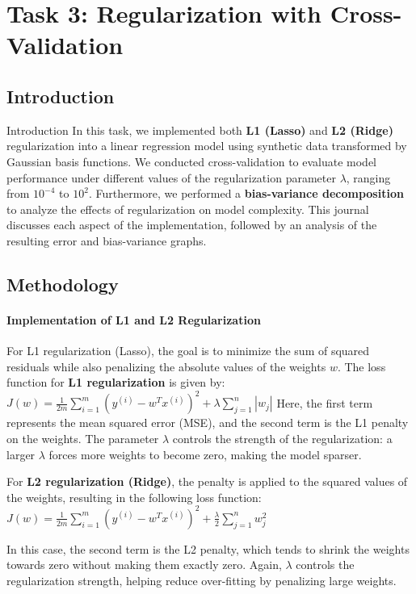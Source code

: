 \documentclass{article}
\begin{document}
\section{Task 3: Regularization with Cross-Validation}

\subsection{Introduction}
\noindent Introduction
In this task, we implemented both \textbf{L1 (Lasso)} and \textbf{L2 (Ridge)} regularization into a linear regression model using synthetic data transformed by Gaussian basis functions. We conducted cross-validation to evaluate model performance under different values of the regularization parameter $\lambda$, ranging from $10^{-4}$ to $10^2$. Furthermore, we performed a \textbf{bias-variance decomposition} to analyze the effects of regularization on model complexity. This journal discusses each aspect of the implementation, followed by an analysis of the resulting error and bias-variance graphs.


\subsection{Methodology}
\paragraph{Implementation of L1 and L2 Regularization}
For L1 regularization (Lasso), the goal is to minimize the sum of squared residuals while also penalizing the absolute values of the weights $w$. The loss function for \textbf{L1 regularization} is given by: $J(w) = \frac{1}{2m} \sum_{i=1}^{m} \left( y^{(i)} - w^T x^{(i)} \right)^2 + \lambda \sum_{j=1}^{n} \left| w_j \right|$
Here, the first term represents the mean squared error (MSE), and the second term is the L1 penalty on the weights. The parameter $\lambda$ controls the strength of the regularization: a larger $\lambda$ forces more weights to become zero, making the model sparser.

For \textbf{L2 regularization (Ridge)}, the penalty is applied to the squared values of the weights, resulting in the following loss function: $J(w)=\frac{1}{2 m} \sum_{i=1}^m\left(y^{(i)}-w^T x^{(i)}\right)^2+\frac{\lambda}{2} \sum_{j=1}^n w_j^2$

In this case, the second term is the L2 penalty, which tends to shrink the weights towards zero without making them exactly zero. Again, $\lambda$ controls the regularization strength, helping reduce over-fitting by penalizing large weights.
\end{document}
